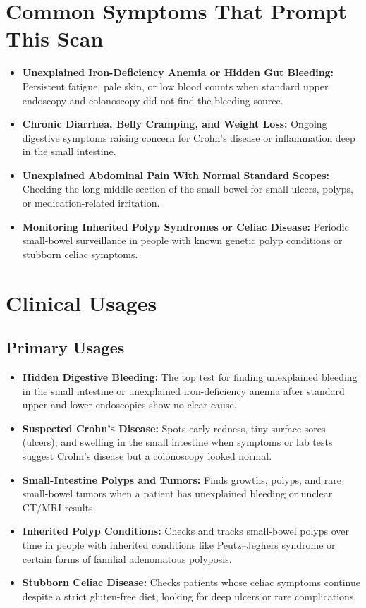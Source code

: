\section{Common Symptoms That Prompt This Scan}
\begin{itemize}
    \item \textbf{Unexplained Iron-Deficiency Anemia or Hidden Gut Bleeding:} Persistent fatigue, pale skin, or low blood counts when standard upper endoscopy and colonoscopy did not find the bleeding source.
    \item \textbf{Chronic Diarrhea, Belly Cramping, and Weight Loss:} Ongoing digestive symptoms raising concern for Crohn's disease or inflammation deep in the small intestine.
    \item \textbf{Unexplained Abdominal Pain With Normal Standard Scopes:} Checking the long middle section of the small bowel for small ulcers, polyps, or medication-related irritation.
    \item \textbf{Monitoring Inherited Polyp Syndromes or Celiac Disease:} Periodic small-bowel surveillance in people with known genetic polyp conditions or stubborn celiac symptoms.
\end{itemize}

\section{Clinical Usages}

\subsection{Primary Usages}
\begin{itemize}
    \item \textbf{Hidden Digestive Bleeding:} The top test for finding unexplained bleeding in the small intestine or unexplained iron-deficiency anemia after standard upper and lower endoscopies show no clear cause.
    \item \textbf{Suspected Crohn's Disease:} Spots early redness, tiny surface sores (ulcers), and swelling in the small intestine when symptoms or lab tests suggest Crohn's disease but a colonoscopy looked normal.
    \item \textbf{Small-Intestine Polyps and Tumors:} Finds growths, polyps, and rare small-bowel tumors when a patient has unexplained bleeding or unclear CT/MRI results.
    \item \textbf{Inherited Polyp Conditions:} Checks and tracks small-bowel polyps over time in people with inherited conditions like Peutz--Jeghers syndrome or certain forms of familial adenomatous polyposis.
    \item \textbf{Stubborn Celiac Disease:} Checks patients whose celiac symptoms continue despite a strict gluten-free diet, looking for deep ulcers or rare complications.
\end{itemize}

